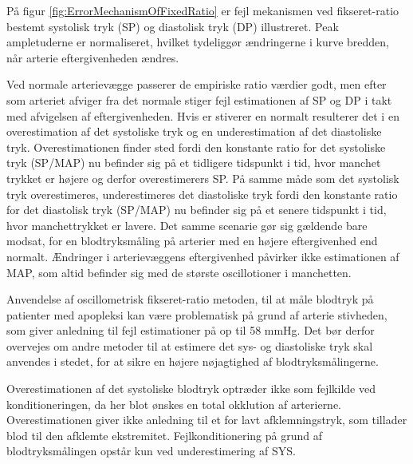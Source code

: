 \begin{minipage}[t]{0.5\textwidth}
På figur \ref{fig:ErrorMechanismOfFixedRatio} er fejl mekanismen ved fikseret-ratio bestemt systolisk tryk (SP) og diastolisk tryk (DP) illustreret. Peak ampletuderne er normaliseret, hvilket tydeliggør ændringerne i kurve bredden, når arterie eftergivenheden ændres. 

Ved normale arterievægge passerer de empiriske ratio værdier godt, men efter som arteriet afviger fra det normale stiger fejl estimationen af SP og DP i takt med afvigelsen af eftergivenheden. Hvis er stiverer en normalt resulterer det i en overestimation af det systoliske tryk og en underestimation af det diastoliske tryk. Overestimationen finder sted fordi den konstante ratio for det systoliske tryk (SP/MAP) nu befinder sig på et tidligere tidspunkt i tid, hvor manchet trykket er højere og derfor overestimerers SP. På samme måde som det systolisk tryk overestimeres, underestimeres det diastoliske tryk fordi den konstante ratio for det diastolisk tryk (SP/MAP) nu befinder sig på et senere tidspunkt i tid, hvor manchettrykket er lavere. Det samme scenarie gør sig gældende bare modsat, for en blodtryksmåling på arterier med en højere eftergivenhed end normalt. Ændringer i arterievæggens eftergivenhed påvirker ikke estimationen af MAP, som altid befinder sig med de største oscillotioner i manchetten.

Anvendelse af oscillometrisk fikseret-ratio metoden, til at måle blodtryk på patienter med apopleksi kan være problematisk på grund af arterie stivheden, som giver anledning til fejl estimationer på op til 58 mmHg. Det bør derfor overvejes om andre metoder til at estimere det sys- og diastoliske tryk skal anvendes i stedet, for at sikre en højere nøjagtighed af blodtryksmålingerne.

Overestimationen af det systoliske blodtryk optræder ikke som fejlkilde ved konditioneringen, da her blot ønskes en total okklution af arterierne. Overestimationen giver ikke anledning til et for lavt afklemningstryk, som tillader blod til den afklemte ekstremitet. Fejlkonditionering på grund af blodtryksmålingen opstår kun ved underestimering af SYS.
\end{minipage}
